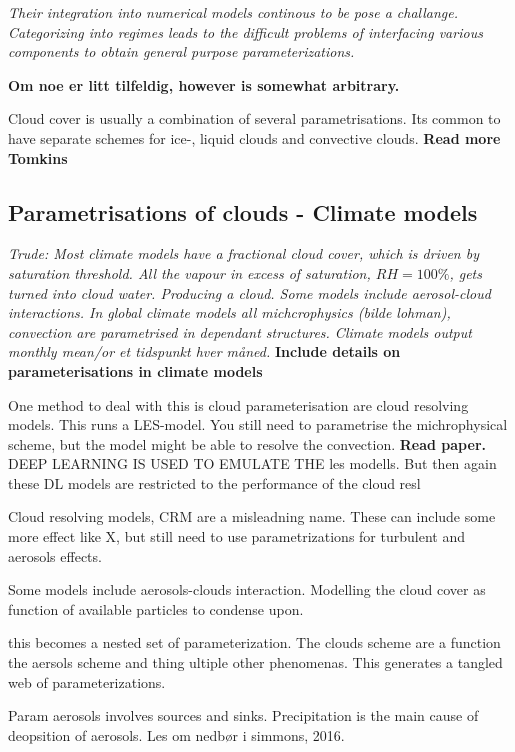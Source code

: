 \textit{Their integration into numerical models continous to be pose a challange.}
\textit{Categorizing into regimes leads to the difficult problems of interfacing various components to obtain general purpose parameterizations.}


\textbf{Om noe er litt tilfeldig, however is somewhat arbitrary.}

Cloud cover is usually a combination of several parametrisations. Its common to have separate schemes for ice-, liquid clouds and convective clouds. \textbf{Read more Tomkins}

\subsection{Parametrisations of clouds - Climate models} \label{sec:params_climate_models}
\textit{Trude: Most climate models have a fractional cloud cover, which is driven by saturation threshold. All the vapour in excess of saturation, $RH=100\%$, gets turned into cloud water. Producing a cloud. Some models include aerosol-cloud interactions. In global climate models all michcrophysics (bilde lohman), convection are parametrised in dependant structures. Climate models output monthly mean/or et tidspunkt hver måned.}
\textbf{Include details on parameterisations in climate models}

One method to deal with this is cloud parameterisation are cloud resolving models. This runs a LES-model. You still need to parametrise the michrophysical scheme, but the model might be able to resolve the convection. \textbf{Read paper.} DEEP LEARNING IS USED TO EMULATE THE les modells. But then again these DL models are restricted to the performance of the cloud resl

Cloud resolving models, CRM are a misleadning name. These can include some more effect like X, but still need to use parametrizations for turbulent and aerosols effects.

Some models include aerosols-clouds interaction. Modelling the cloud cover as 
function of available particles to condense upon. 

this becomes a nested set of parameterization. The clouds scheme are a function the aersols scheme and thing ultiple other phenomenas. This generates a tangled web of parameterizations.

Param aerosols involves sources and sinks. Precipitation is the main cause of deopsition of aerosols. Les om nedbør i simmons, 2016. 

